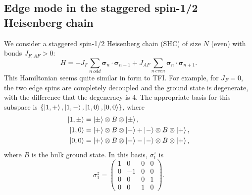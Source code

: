 \documentclass[12pt]{report}
\newcommand{\s}{\sigma}
\newcommand{\sv}{\pmb{\sigma}}
\begin{document}
\subsection*{Edge mode in the staggered spin-1/2 Heisenberg chain}
We consider a staggered spin-1/2 Heisenberg chain (SHC) of size $N$ (even) with bonds $J_{F,AF}>0$:
%
\begin{equation*}
H = -J_F\sum_{n~odd} \sv_n \cdot \sv_{n+1} + J_{AF}\sum_{n~even} \sv_n \cdot \sv_{n+1}.
\end{equation*}
%
This Hamiltonian seems quite similar in form to TFI. For example, for $J_F = 0$, the two edge spins are completely decoupled and the ground state is degenerate, with the difference that the degeneracy is $4$. The appropriate basis for this subspace is $\{\ket{1,+},\ket{1,-},\ket{1,0},\ket{0,0}\}$, where
%
\begin{align*}
\ket{1,\pm} &= \ket{\pm}\otimes B \otimes\ket{\pm},\\
\ket{1,0} &= \ket{+}\otimes B\otimes\ket{-}+ \ket{-}\otimes B\otimes\ket{+},\\
\ket{0,0} &= \ket{+}\otimes B\otimes\ket{-}- \ket{-}\otimes B\otimes\ket{+},
\end{align*}
%
where $B$ is the bulk ground state. In this basis, $\s_1^z$ is
%
\begin{equation}
\s_1^z =
\left(\begin{matrix}
1 & 0 & 0 & 0\\
0 & -1 & 0 & 0\\
0 & 0 & 0 & 1\\
0 & 0 & 1 & 0
\end{matrix}\right).
\end{equation}
%
%
\end{document}

